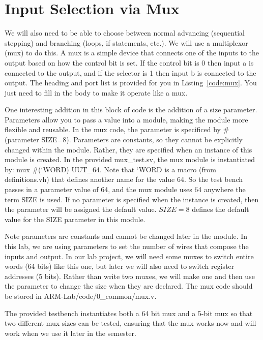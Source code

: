 \section{Input Selection via Mux}

We will also need to be able to choose between normal advancing (sequential stepping) and branching (loops, if statements, etc.).  We will use a multiplexor (mux) to do this.  A mux is a simple device that connects one of the inputs to the output based on how the control bit is set.  If the control bit is 0 then input a is connected to the output, and if the selector is 1 then input b is connected to the output.  The heading and port list is provided for you in Listing~\ref{code:mux}.  You just need to fill in the body to make it operate like a mux.  

One interesting addition in this block of code is the addition of a size parameter.  Parameters allow you to pass a value into a module, making the module more flexible and reusable.  In the mux code, the parameter is specificed by \#(parameter SIZE=8).  Parameters are constants, so they cannot be explicitly changed within the module.  Rather, they are specified when an instance of this module is created.  In the provided mux\_test.sv, the mux module is instantiated by: mux \#(`WORD) UUT\_64.  Note that `WORD is a macro (from definitions.vh) that defines another name for the value 64.  So the test bench passes in a parameter value of 64, and the mux module uses 64 anywhere the term SIZE is used.  If no parameter is specified when the instance is created, then the parameter will be assigned the default value.  $SIZE=8$ defines the default value for the SIZE parameter in this module.

Note parameters are constants and cannot be changed later in the module.  In this lab, we are using parameters to set the number of wires that compose the inputs and output.  In our lab project, we will need some muxes to switch entire words (64 bits) like this one, but later we will also need to switch register addresses (5 bits).  Rather than write two muxes, we will make one and then use the parameter to change the size when they are declared.  The mux code should be stored in ARM-Lab/code/0\_common/mux.v.

The provided testbench instantiates both a 64 bit mux and a 5-bit mux so that two different mux sizes can be tested, ensuring that the mux works now and will work when we use it later in the semester.


